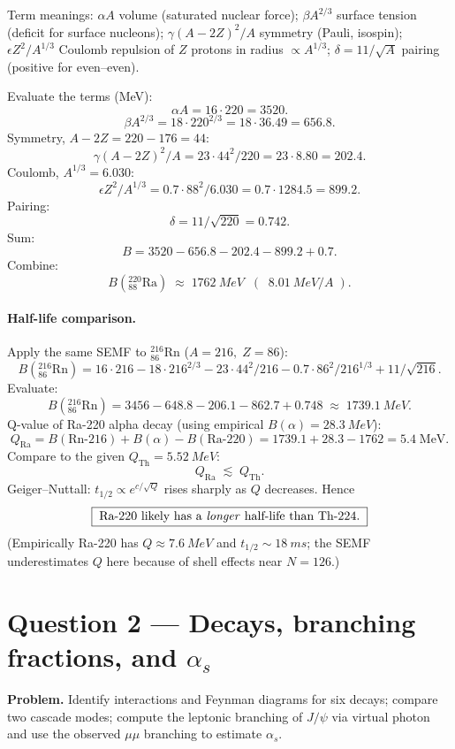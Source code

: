 \documentclass[11pt]{article}
\begin{document}
Term meanings: $\alpha A$ volume (saturated nuclear force); $\beta A^{2/3}$ surface tension (deficit for surface nucleons); $\gamma(A-2Z)^2/A$ symmetry (Pauli, isospin); $\epsilon Z^2/A^{1/3}$ Coulomb repulsion of $Z$ protons in radius $\propto A^{1/3}$; $\delta=11/\sqrt{A}$ pairing (positive for even--even).

Evaluate the terms (MeV):
\[
\alpha A = 16\cdot 220 = 3520.
\]
\[
\beta A^{2/3} = 18\cdot 220^{2/3} = 18\cdot 36.49 = 656.8.
\]
Symmetry, $A-2Z = 220-176 = 44$:
\[
\gamma(A-2Z)^2/A = 23\cdot 44^2/220 = 23\cdot 8.80 = 202.4.
\]
Coulomb, $A^{1/3}=6.030$:
\[
\epsilon Z^2/A^{1/3} = 0.7\cdot 88^2/6.030 = 0.7\cdot 1284.5 = 899.2.
\]
Pairing:
\[
\delta = 11/\sqrt{220} = 0.742.
\]
Sum:
\[
B = 3520 - 656.8 - 202.4 - 899.2 + 0.7.
\]
Combine:
\[
\boxed{\;B(^{220}_{88}\text{Ra}) \;\approx\; \SI{1762}{MeV} \;\;(\;\;\!\SI{8.01}{MeV/A}\;).\;}
\]

\paragraph{Half-life comparison.} Apply the same SEMF to $^{216}_{86}\text{Rn}$ ($A=216,\;Z=86$):
\[
B(^{216}_{86}\text{Rn}) = 16\cdot 216 - 18\cdot 216^{2/3} - 23\cdot 44^2/216 - 0.7\cdot 86^2/216^{1/3} + 11/\sqrt{216}.
\]
Evaluate:
\[
B(^{216}_{86}\text{Rn}) = 3456 - 648.8 - 206.1 - 862.7 + 0.748 \;\approx\; \SI{1739.1}{MeV}.
\]
Q-value of Ra-220 alpha decay (using empirical $B(\alpha)=\SI{28.3}{MeV}$):
\[
Q_\text{Ra} = B(\text{Rn-216}) + B(\alpha) - B(\text{Ra-220}) = 1739.1 + 28.3 - 1762 = 5.4\;\text{MeV}.
\]
Compare to the given $Q_\text{Th}=\SI{5.52}{MeV}$:
\[
Q_\text{Ra}\;\lesssim\;Q_\text{Th}.
\]
Geiger--Nuttall: $t_{1/2}\propto e^{c/\sqrt{Q}}$ rises sharply as $Q$ decreases. Hence
\[
\boxed{\;\text{Ra-220 likely has a \emph{longer} half-life than Th-224.}\;}
\]
(Empirically Ra-220 has $Q\approx\SI{7.6}{MeV}$ and $t_{1/2}\sim\SI{18}{ms}$; the SEMF underestimates $Q$ here because of shell effects near $N=126$.)

\section*{Question 2 --- Decays, branching fractions, and $\alpha_s$}

\textbf{Problem.} Identify interactions and Feynman diagrams for six decays; compare two cascade modes; compute the leptonic branching of $J/\psi$ via virtual photon and use the observed $\mu\mu$ branching to estimate $\alpha_s$.
\end{document}
